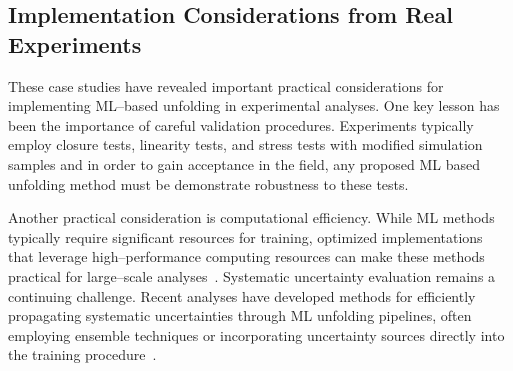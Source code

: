 \subsection{Implementation Considerations from Real Experiments}
    These case studies have revealed important practical considerations for implementing ML--based unfolding in experimental analyses.
    One key lesson has been the importance of careful validation procedures.
    Experiments typically employ closure tests, linearity tests, and stress tests with modified simulation samples and in order to gain acceptance in the field, any proposed ML based unfolding method must be demonstrate robustness to these tests.

    Another practical consideration is computational efficiency.
    While ML methods typically require significant resources for training, optimized implementations that leverage high--performance computing resources can make these methods practical for large--scale analyses~\cite{HEPSoftwareFoundation:2017ggl}.
    Systematic uncertainty evaluation remains a continuing challenge.
    Recent analyses have developed methods for efficiently propagating systematic uncertainties through ML unfolding pipelines, often employing ensemble techniques or incorporating uncertainty sources directly into the training procedure~\cite{Falcao:2025jom,Huang2025MachineTechnique}.

